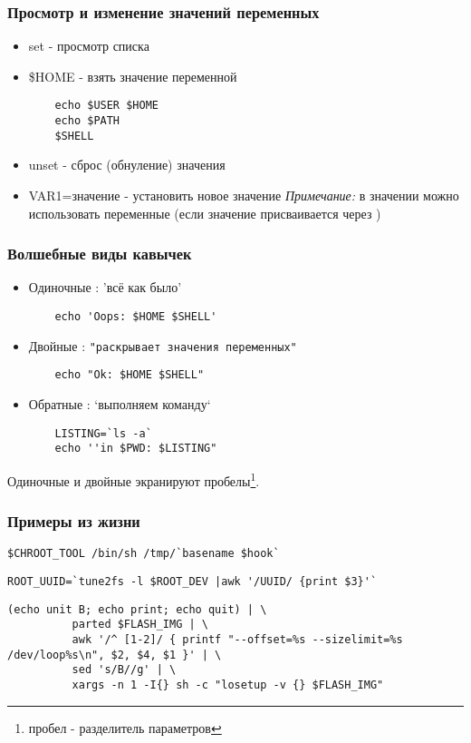 \begin{frame}[fragile]
  \frametitle{Просмотр и изменение значений переменных}
  \normalsize{ }
  \begin{itemize}
    \item \alert{set} - просмотр списка \pause
    \item \alert{\$HOME} - взять значение переменной \pause
\begin{lstlisting}
	echo $USER $HOME
	echo $PATH 
	$SHELL
\end{lstlisting} \pause 
    \item \alert{unset} - сброс (обнуление) значения \pause
    \item \alert{VAR1=\textquotedbl значение \textquotedbl} - установить новое значение \newline 
      \emph{Примечание:} в значении можно использовать переменные (если значение присваивается через \textquotedbl \textquotedbl )
  \end{itemize}

\end{frame}

\begin{frame}[fragile]
  \frametitle{Волшебные виды кавычек}

  \begin{itemize}
    \item \alert{Одиночные} : 'всё как было'
\begin{lstlisting}
	echo 'Oops: $HOME $SHELL'
\end{lstlisting} \pause
    \item \alert{Двойные} :  \verb+"раскрывает значения переменных"+
\begin{lstlisting}
	echo "Ok: $HOME $SHELL"
\end{lstlisting} \pause
    \item \alert{Обратные} : `выполняем команду`
\begin{lstlisting}
	LISTING=`ls -a`
	echo ''in $PWD: $LISTING"
\end{lstlisting}
  \end{itemize}
  Одиночные и двойные экранируют пробелы\footnote{пробел - разделитель параметров}.
\end{frame}

\begin{frame}[fragile]
  \frametitle{Примеры из жизни}
\begin{lstlisting}[basicstyle=\normalsize]
    $CHROOT_TOOL /bin/sh /tmp/`basename $hook`
\end{lstlisting} \pause

\begin{lstlisting}[basicstyle=\normalsize]
    ROOT_UUID=`tune2fs -l $ROOT_DEV |awk '/UUID/ {print $3}'`
\end{lstlisting} \pause
  
\begin{lstlisting}[basicstyle=\small]
    (echo unit B; echo print; echo quit) | \
          parted $FLASH_IMG | \
          awk '/^ [1-2]/ { printf "--offset=%s --sizelimit=%s /dev/loop%s\n", $2, $4, $1 }' | \
          sed 's/B//g' | \
          xargs -n 1 -I{} sh -c "losetup -v {} $FLASH_IMG"
\end{lstlisting}
\end{frame}

